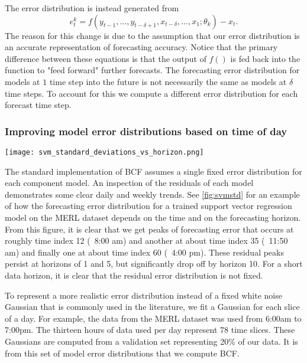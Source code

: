 The error distribution is instead generated from 
\begin{equation}
e_{t}^{k} = f(y_{t - 1}, ..., y_{t - \delta + 1}, x_{t - \delta}, ..., x_{1};\theta_{k}) - x_{t}.
\end{equation}
The reason for this change is due to the assumption that our error distribution is an accurate representation of forecasting accuracy.  Notice that the primary difference between these equations is that the output of $f()$ is fed back into the function to "feed forward" further forecasts.  
The forecasting error distribution for models at $1$ time step into the future is not necessarily the same as models at $\delta$ time steps.  To account for this we compute a different error distribution for each forecast time step.


\subsubsection{Improving model error distributions based on time of day}

\begin{figure*}[t]
\centering
\texttt{[image: svm\_standard\_deviations\_vs\_horizon.png]}
\caption{Standard deviation of support vector machine residuals for all Wednesdays in MERL dataset.  Time index represents 10 minute intervals from 6:00am to 7:00pm.}
\label{fig:svmstd}
\end{figure*}

The standard implementation of BCF assumes a single fixed error distribution for each component model.  An inspection of the residuals of each model demonstrates some clear daily and weekly trends.  See \ref{fig:svmstd} for an example of how the forecasting error distribution for a trained support vector regression model on the MERL dataset depends on the time and on the forecasting horizon.  From this figure, it is clear that we get peaks of forecasting error that occurs at roughly time index 12 (~8:00 am) and another at about time index 35 (~11:50 am) and finally one at about time index 60 (~4:00 pm).  These residual peaks persist at horizons of 1 and 5, but significantly drop off by horizon 10.  For a short data horizon, it is clear that the residual error distribution is not fixed.

To represent a more realistic error distribution instead of a fixed white noise Gaussian that is commonly used in the literature, we fit a Gaussian for each slice of a day.  For example, the data from the MERL dataset was used from 6:00am to 7:00pm. The thirteen hours of data used per day represent 78 time slices.  These Gaussians are computed from a validation set representing 20\% of our data.  It is from this set of model error distributions that we compute BCF.

